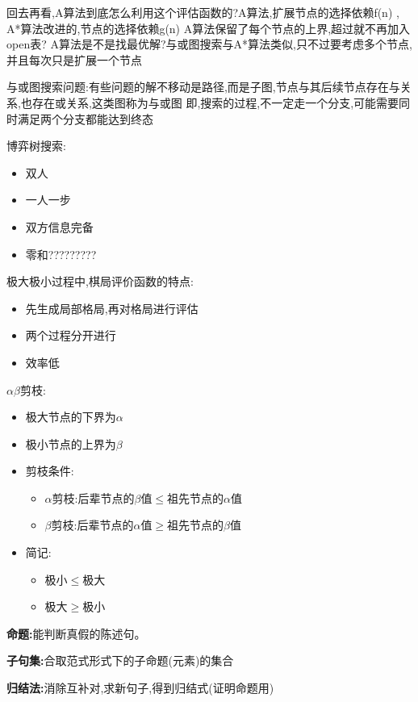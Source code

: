 \documentclass[UTF8,a4paper]{ctexart}
\begin{document}
  {回去再看,A算法到底怎么利用这个评估函数的?A算法,扩展节点的选择依赖f(n) , A*算法改进的,节点的选择依赖g(n)
  A算法保留了每个节点的上界,超过就不再加入open表?
  A算法是不是找最优解?与或图搜索与A*算法类似,只不过要考虑多个节点,并且每次只是扩展一个节点
  }

  与或图搜索问题:有些问题的解不移动是路径,而是子图,节点与其后续节点存在与关系,也存在或关系,这类图称为与或图
  即,搜索的过程,不一定走一个分支,可能需要同时满足两个分支都能达到终态

  博弈树搜索:
  \begin{itemize}
    \item 双人
    \item 一人一步
    \item 双方信息完备
    \item 零和{?????????}
  \end{itemize}

  极大极小过程中,棋局评价函数的特点:
  \begin{itemize}
    \item 先生成局部格局,再对格局进行评估
    \item 两个过程分开进行
    \item 效率低
  \end{itemize}

  $\alpha \beta$剪枝:
  \begin{itemize}
    \item 极大节点的下界为$\alpha$
    \item 极小节点的上界为$\beta$
    \item 剪枝条件:
      \begin{itemize}
        \item $\alpha$剪枝:后辈节点的$\beta$值$\leq$祖先节点的$\alpha$值
        \item $\beta$剪枝:后辈节点的$\alpha$值$\geq$祖先节点的$\beta$值
      \end{itemize}
    \item 简记:
      \begin{itemize}
        \item 极小$\leq$极大
        \item 极大$\geq$极小
      \end{itemize}
  \end{itemize}


\textbf{命题:}能判断真假的陈述句。

\textbf{子句集:}合取范式形式下的子命题(元素)的集合

\textbf{归结法:}消除互补对,求新句子,得到归结式(证明命题用)
\end{document}
